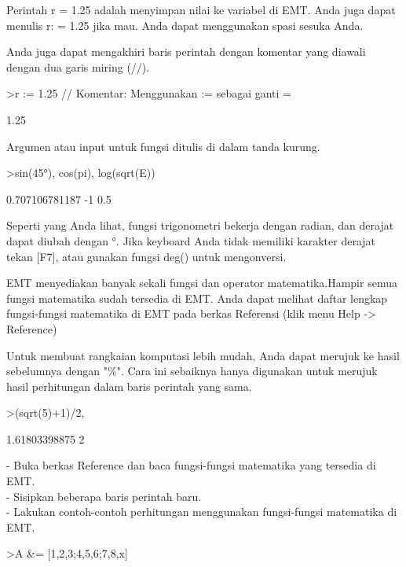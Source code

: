 \documentclass{article}
\begin{document}
\begin{eulernotebook}
\begin{eulercomment}
\begin{eulercomment}
\begin{eulercomment}
Perintah r = 1.25 adalah menyimpan nilai ke variabel di EMT. Anda juga
dapat menulis r: = 1.25 jika mau. Anda dapat menggunakan spasi sesuka
Anda.

Anda juga dapat mengakhiri baris perintah dengan komentar yang diawali
dengan dua garis miring (//).
\end{eulercomment}
\begin{eulerprompt}
>r := 1.25 // Komentar: Menggunakan  := sebagai ganti =
\end{eulerprompt}
\begin{euleroutput}
  1.25
\end{euleroutput}
\begin{eulercomment}
Argumen atau input untuk fungsi ditulis di dalam tanda kurung.
\end{eulercomment}
\begin{eulerprompt}
>sin(45°), cos(pi), log(sqrt(E))
\end{eulerprompt}
\begin{euleroutput}
  0.707106781187
  -1
  0.5
\end{euleroutput}
\begin{eulercomment}
Seperti yang Anda lihat, fungsi trigonometri bekerja dengan radian, dan derajat
dapat diubah dengan °. Jika keyboard Anda tidak memiliki karakter derajat tekan
[F7], atau gunakan fungsi deg() untuk mengonversi.

EMT menyediakan banyak sekali fungsi dan operator matematika.Hampir semua fungsi
matematika sudah tersedia di EMT. Anda dapat melihat daftar lengkap fungsi-fungsi
matematika di EMT pada berkas Referensi (klik menu Help -\textgreater{} Reference)

Untuk membuat rangkaian komputasi lebih mudah, Anda dapat merujuk ke hasil
sebelumnya dengan "\%". Cara ini sebaiknya hanya digunakan untuk merujuk hasil
perhitungan dalam baris perintah yang sama.
\end{eulercomment}
\begin{eulerprompt}
>(sqrt(5)+1)/2, %
\end{eulerprompt}
\begin{euleroutput}
  1.61803398875
  2
\end{euleroutput}
\begin{eulercomment}
- Buka berkas Reference dan baca fungsi-fungsi matematika yang
tersedia di EMT.\\
- Sisipkan beberapa baris perintah baru.\\
- Lakukan contoh-contoh perhitungan menggunakan fungsi-fungsi
matematika di EMT.\\
\end{eulercomment}
\eulersubheading{}
\begin{eulercomment}
\end{eulercomment}
\begin{eulerprompt}
>A &= [1,2,3;4,5,6;7,8,x]
\end{eulerprompt}
\begin{euleroutput}
  

\end{euleroutput}
\end{eulercomment}
\end{eulercomment}
\end{eulernotebook}
\end{document}

